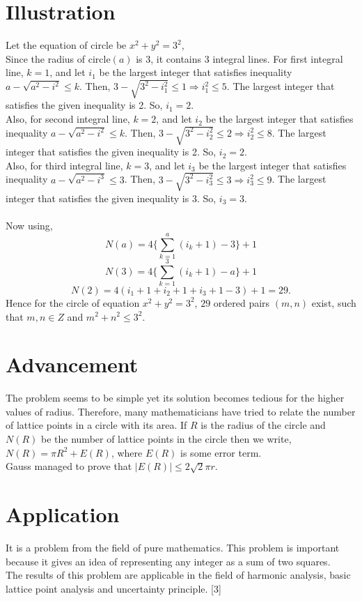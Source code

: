 \documentclass[journal,twoside]{IEEEtran}
\begin{document}
\section{Illustration}
Let the equation of circle be $x^{2}+y^{2}=3^{2}$,
\\Since the radius of circle$(a)$ is 3, it contains 3 integral lines. For first integral line, $k=1$, and let $i_{1}$ be the largest integer that satisfies inequality $a- \sqrt{a^{2}-i^{2}} \leq k$. Then, $3- \sqrt{3^{2}-i_{1}^{2}} \leq 1 \Rightarrow i_{1}^{2} \leq 5 $. The largest integer that satisfies the given inequality is 2. So, $i_{1}=2$.
\\Also, for second integral line, $k=2$, and let $i_{2}$ be the largest integer that satisfies inequality $a- \sqrt{a^{2}-i^{2}} \leq k$. Then, $3- \sqrt{3^{2}-i_{2}^{2}} \leq 2 \Rightarrow i_{2}^{2} \leq 8 $. The largest integer that satisfies the given inequality is 2. So, $i_{2}=2$.
\\Also, for third integral line, $k=3$, and let $i_{3}$ be the largest integer that satisfies inequality $a- \sqrt{a^{2}-i^{3}} \leq 3$. Then, $3- \sqrt{3^{2}-i_{3}^{2}} \leq 3 \Rightarrow i_{3}^{2} \leq 9 $. The largest integer that satisfies the given inequality is 3. So, $i_{3}=3$.
\\\\Now using, $$N(a)=4\bigg\{\sum_{k=1}^{a}(i_{k}+1)-3\bigg\}+1$$
$$N(3)=4\bigg\{\sum_{k=1}^{3}(i_{k}+1)-a\bigg\}+1$$
$$N(2)=4(i_{1}+1+i_{2}+1+i_{3}+1-3)+1= 29.$$
Hence for the circle of equation $x^{2}+y^{2}=3^{2}$, $29$ ordered pairs $(m,n)$ exist, such that $m,n \in Z$ and $m^{2}+n^{2} \leq 3^{2}$.

\section{Advancement}
The problem seems to be simple yet its solution becomes tedious for the higher values of radius.
Therefore, many mathematicians have tried to relate the number of lattice points in a circle with its area. If $R$ is the radius of the circle and $N(R)$ be the number of lattice points in the circle then we write, $N(R) = \pi R^{2} + E(R)$, where $E(R)$ is some error term. 
\\Gauss managed to prove that $|E(R)| \leq 2\sqrt{2}\pi r.$

\section{Application}
It is a problem from the field of pure mathematics. This problem is important because it gives an idea of representing any integer as a sum of two squares. 
\\The results of this problem are applicable in the field of harmonic analysis, basic lattice point analysis and uncertainty principle. [3] 
\end{document}
